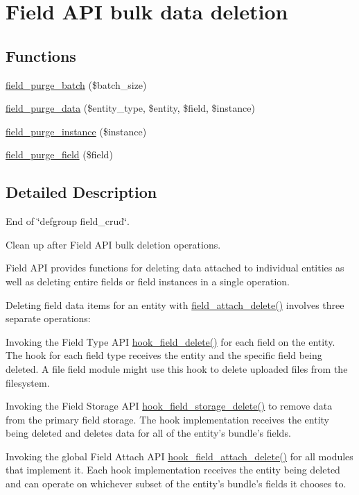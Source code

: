 \hypertarget{group__field__purge}{
\section{Field API bulk data deletion}
\label{group__field__purge}
}
\subsection*{Functions}
\begin{DoxyCompactItemize}
\item 
\hyperlink{group__field__purge_gac0dcacb53338e25ac4e2add6b427757e}{field\_\-purge\_\-batch} (\$batch\_\-size)
\item 
\hyperlink{group__field__purge_ga93ec2f273b56141a5079bfaf25d6b80e}{field\_\-purge\_\-data} (\$entity\_\-type, \$entity, \$field, \$instance)
\item 
\hyperlink{group__field__purge_ga766cee439c7c920d3d406c7af41c8968}{field\_\-purge\_\-instance} (\$instance)
\item 
\hyperlink{group__field__purge_gac52122a65da997921f3a6a8f45deddbf}{field\_\-purge\_\-field} (\$field)
\end{DoxyCompactItemize}


\subsection{Detailed Description}
End of \char`\"{}defgroup field\_\-crud\char`\"{}.

Clean up after Field API bulk deletion operations.

Field API provides functions for deleting data attached to individual entities as well as deleting entire fields or field instances in a single operation.

Deleting field data items for an entity with \hyperlink{group__field__attach_gac2e3658c9c02d0d0e71359f9ef2f207a}{field\_\-attach\_\-delete()} involves three separate operations:
\begin{DoxyItemize}
\item Invoking the Field Type API \hyperlink{group__field__types_gaf1e5787044b83d34cf7daed3d5297336}{hook\_\-field\_\-delete()} for each field on the entity. The hook for each field type receives the entity and the specific field being deleted. A file field module might use this hook to delete uploaded files from the filesystem.
\item Invoking the Field Storage API \hyperlink{group__field__storage_ga64bd5adc0e4ccc1fe52fbaabcfa10274}{hook\_\-field\_\-storage\_\-delete()} to remove data from the primary field storage. The hook implementation receives the entity being deleted and deletes data for all of the entity's bundle's fields.
\item Invoking the global Field Attach API \hyperlink{group__field__attach_gac9e5a9e43f1290315db8b593b9516094}{hook\_\-field\_\-attach\_\-delete()} for all modules that implement it. Each hook implementation receives the entity being deleted and can operate on whichever subset of the entity's bundle's fields it chooses to.
\end{DoxyItemize}

